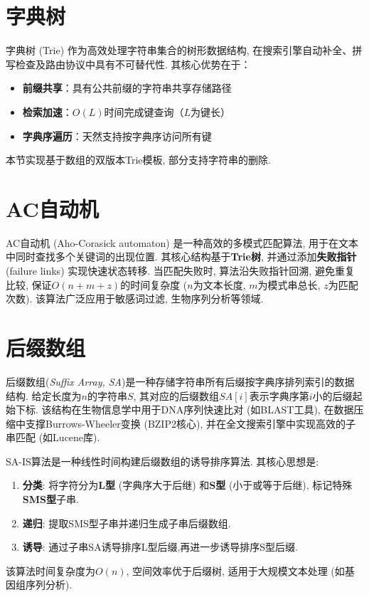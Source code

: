 \documentclass[a4paper]{ctexbook}
\begin{document}


\section{字典树}

字典树 (Trie) 作为高效处理字符串集合的树形数据结构, 在搜索引擎自动补全、拼写检查及路由协议中具有不可替代性. 其核心优势在于：
\begin{itemize}
	\item \textbf{前缀共享}：具有公共前缀的字符串共享存储路径
	\item \textbf{检索加速}：$O(L)$时间完成键查询（$L$为键长）
	\item \textbf{字典序遍历}：天然支持按字典序访问所有键
\end{itemize}

本节实现基于数组的双版本Trie模板, 部分支持字符串的删除.



\section{AC自动机}

AC自动机 (Aho-Corasick automaton) 是一种高效的多模式匹配算法, 用于在文本中同时查找多个关键词的出现位置. 其核心结构基于\textbf{Trie树}, 并通过添加\textbf{失败指针} (failure links) 实现快速状态转移.
当匹配失败时, 算法沿失败指针回溯, 避免重复比较, 保证$O(n+m+z)$的时间复杂度 ($n$为文本长度, $m$为模式串总长, $z$为匹配次数). 该算法广泛应用于敏感词过滤, 生物序列分析等领域.



\section{后缀数组}

后缀数组(\textit{Suffix Array, SA})是一种存储字符串所有后缀按字典序排列索引的数据结构. 给定长度为$n$的字符串$S$, 其对应的后缀数组$SA[i]$表示字典序第$i$小的后缀起始下标. 该结构在生物信息学中用于DNA序列快速比对 (如BLAST工具), 在数据压缩中支撑Burrows-Wheeler变换 (BZIP2核心), 并在全文搜索引擎中实现高效的子串匹配 (如Lucene库).

SA-IS算法是一种线性时间构建后缀数组的诱导排序算法. 其核心思想是:
\begin{enumerate}
  \item \textbf{分类}: 将字符分为\textbf{L型} (字典序大于后继) 和\textbf{S型} (小于或等于后继), 标记特殊\textbf{SMS型}子串.
	\item \textbf{递归}: 提取SMS型子串并递归生成子串后缀数组.
	\item \textbf{诱导}: 通过子串SA诱导排序L型后缀,再进一步诱导排序S型后缀.
\end{enumerate}
该算法时间复杂度为$O(n)$, 空间效率优于后缀树, 适用于大规模文本处理 (如基因组序列分析).
\end{document}

